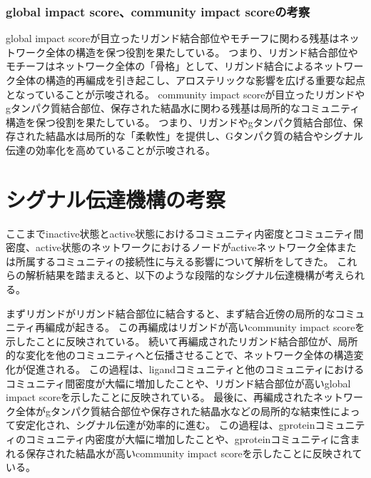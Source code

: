\subsubsection{global impact score、community impact scoreの考察}

global impact scoreが目立ったリガンド結合部位やモチーフに関わる残基はネットワーク全体の構造を保つ役割を果たしている。
つまり、リガンド結合部位やモチーフはネットワーク全体の「骨格」として、リガンド結合によるネットワーク全体の構造的再編成を引き起こし、アロステリックな影響を広げる重要な起点となっていることが示唆される。
community impact scoreが目立ったリガンドやgタンパク質結合部位、保存された結晶水に関わる残基は局所的なコミュニティ構造を保つ役割を果たしている。
つまり、リガンドやgタンパク質結合部位、保存された結晶水は局所的な「柔軟性」を提供し、Gタンパク質の結合やシグナル伝達の効率化を高めていることが示唆される。


\section{シグナル伝達機構の考察}

ここまでinactive状態とactive状態におけるコミュニティ内密度とコミュニティ間密度、active状態のネットワークにおけるノードがactiveネットワーク全体または所属するコミュニティの接続性に与える影響について解析をしてきた。
これらの解析結果を踏まえると、以下のような段階的なシグナル伝達機構が考えられる。

まずリガンドがリガンド結合部位に結合すると、まず結合近傍の局所的なコミュニティ再編成が起きる。
この再編成はリガンドが高いcommunity impact scoreを示したことに反映されている。
続いて再編成されたリガンド結合部位が、局所的な変化を他のコミュニティへと伝播させることで、ネットワーク全体の構造変化が促進される。
この過程は、ligandコミュニティと他のコミュニティにおけるコミュニティ間密度が大幅に増加したことや、リガンド結合部位が高いglobal impact scoreを示したことに反映されている。
最後に、再編成されたネットワーク全体がgタンパク質結合部位や保存された結晶水などの局所的な結束性によって安定化され、シグナル伝達が効率的に進む。
この過程は、gproteinコミュニティのコミュニティ内密度が大幅に増加したことや、gproteinコミュニティに含まれる保存された結晶水が高いcommunity impact scoreを示したことに反映されている。